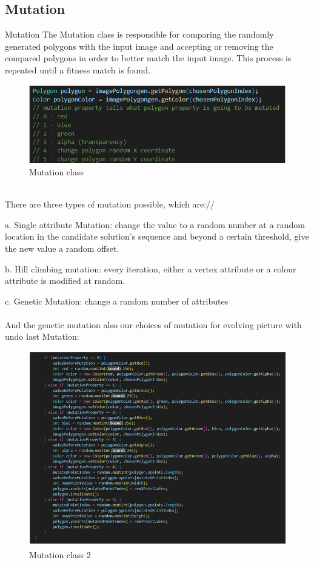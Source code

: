 \subsection{Mutation}
\label{Mutation}
Mutation
The Mutation class is responsible for comparing the randomly generated polygons with the input image and accepting or removing the compared polygons in order to better match the input image. This process is repeated until a fitness match is found.
\begin{figure}
\centering
\includegraphics[width=4.5in]{images/polymu.png}

\caption{Mutation class}
\end{figure}
\\
There are three types of mutation possible, which are://

a. Single attribute Mutation: change the value to a random number at a random location in the candidate solution's sequence and beyond a certain threshold, give the new value a random offset.

b. Hill climbing mutation: every iteration, either a vertex attribute or a colour attribute is modified at random.

c. Genetic Mutation: change a random number of attributes 
\\
\\And the genetic mutation also our choices of mutation for evolving picture with undo last Mutation:

\begin{figure}
\centering
\includegraphics[width=4.5in]{images/elseif.png}
\caption{Mutation class 2}
\end{figure}

